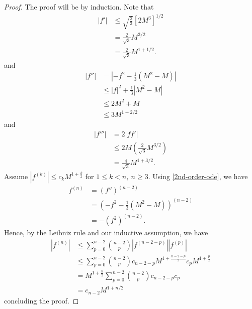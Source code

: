 \documentclass[12pt,reqno]{amsart}
\numberwithin{equation}{section}  %
\begin{document}
%
%
%
\begin{proof}
The proof will be by induction. Note that 
%
%
\begin{equation*}
\begin{split}
  | f' |
  & \le \sqrt{\frac{2}{3}} \left[ 2M^{3} \right]^{1/2}
  \\
  & = \frac{2}{\sqrt{3}}M^{3/2}
  \\
  & = \frac{2}{\sqrt{3}}M^{1 + 1/2}.
\end{split}
\end{equation*}
%
and
%
%
\begin{equation*}
\begin{split}
| f'' |
& = | -f^{2} - \frac{1}{3}(M^{2} - M) |
\\
& \le | f |^{2} + \frac{1}{3}| M^{2} - M |
\\
& \le 2M^{2} + M
\\
& \le 3M^{1 + 2/2}
\end{split}
\end{equation*}
%
and
%
%
\begin{equation*}
\begin{split}
| f''' | 
& = 2 |ff'  |
\\
& \le 2M\left( \frac{2}{\sqrt{3}} M^{3/2} \right)
\\
& = \frac{4}{\sqrt{3}} M^{1 + 3/2}.
\end{split}
\end{equation*}
%
%
%
%
Assume $| f^{(k)} | \le c_{k} M^{1 + \frac{k}{2}}$ for $1 \le k < n, \ n \ge 3$.
Using \eqref{2nd-order-ode}, we have
%
%
\begin{equation*}
\begin{split}
  f^{(n)}
  & =
  (f'')^{(n-2)}
  \\
  & = \left( -f^{2} - \frac{1}{3}(M^{2} - M) \right)^{(n-2)}
  \\
  & = -(f^{2})^{(n-2)}.
\end{split}
\end{equation*}
%
%
Hence, by the Leibniz rule and our inductive assumption, we have
%
%
\begin{equation*}
\begin{split}
  | f^{(n)} |
  & \le  \sum_{p=0}^{n-2} \binom{n-2}{p} | f^{(n-2-p)} | |
  f^{(p)} |
  \\
  & \le  \sum_{p=0}^{n-2} \binom{n-2}{p} c_{n-2-p}M^{1 +
  \frac{n-2-p}{2}}c_{p}M^{1 + \frac{p}{2}}
  \\
  & = M^{1 + \frac{n}{2}} \sum_{p=0}^{n-2} \binom{n-2}{p} c_{n-2-p}c_{p}
  \\
  & = c_{n-2}M^{1 + n/2}
\end{split}
\end{equation*}
%
%
concluding the proof.
\end{proof}
\end{document}
